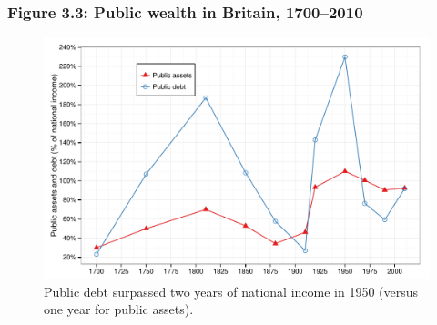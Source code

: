 \documentclass[t]{beamer}\usepackage[]{graphicx}\usepackage[]{color}
\newenvironment{knitrout}{}{} %
\begin{document}
\begin{frame}[label=Figure_3_3]
\frametitle{Figure 3.3: Public wealth in Britain, 1700--2010}
\begin{figure}[t]
\begin{minipage}[b]{\textwidth}
\centering
\begin{knitrout}\footnotesize
{}\color{fgcolor}

{\centering \includegraphics[width=1\linewidth]{figures/color/Figure_3_3} 

}



\end{knitrout}
\caption{Public debt surpassed two years of national income in 1950 (versus one year for public assets).}
\end{minipage}
\end{figure}
\end{frame}
\end{document}
